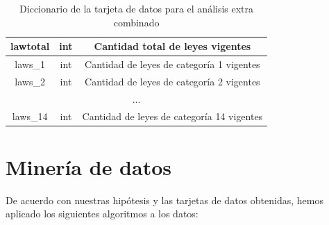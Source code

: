 \documentclass[11pt,a4paper]{article}
\begin{document}
\begin{table}[H]
{\begin{tabular}{|ccc|}
\multicolumn{1}{|c|}{lawtotal}               & \multicolumn{1}{c|}{int}                   & Cantidad total de leyes vigentes                                                                                                                                                                            \\ \hline
\multicolumn{1}{|c|}{laws\_1}                & \multicolumn{1}{c|}{int}                   & Cantidad de leyes de categoría 1 vigentes                                                                                                                                                                   \\ \hline
\multicolumn{1}{|c|}{laws\_2}                & \multicolumn{1}{c|}{int}                   & Cantidad de leyes de categoría 2 vigentes                                                                                                                                                                   \\ \hline
\multicolumn{3}{|c|}{...}                                                                                                                                                                                                                                                                               \\ \hline
\multicolumn{1}{|c|}{laws\_14}               & \multicolumn{1}{c|}{int}                   & Cantidad de leyes de categoría 14 vigentes                                                                                                                                                                  \\ \hline
\end{tabular}
}
    \caption{Diccionario de la tarjeta de datos para el análisis extra combinado}
    \label{tab:datacard_extra}
\end{table}

\section{Minería de datos}

De acuerdo con nuestras hipótesis y las tarjetas de datos obtenidas, hemos aplicado los siguientes algoritmos a los datos:
\end{document}
